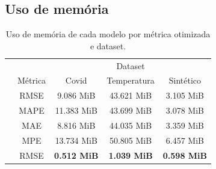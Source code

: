 \FloatBarrier

\subsection{Uso de memória}

\begin{table}[!htp]
    \caption{Uso de memória de cada modelo por métrica otimizada e dataset.}
    \setlength\extrarowheight{5pt}
    \centering
    \begin{tabular}{|c|c|ccc|}
        \hline
        \rowcolor[HTML]{C0C0C0}
        \cellcolor[HTML]{C0C0C0}                          & \cellcolor[HTML]{C0C0C0}                          & \multicolumn{3}{c|}{\cellcolor[HTML]{C0C0C0}Dataset}                                                                                                   \\ \cline{3-5}
        \rowcolor[HTML]{C0C0C0}
        \multirow{-2}{*}{\cellcolor[HTML]{C0C0C0}Modelo}  & \multirow{-2}{*}{\cellcolor[HTML]{C0C0C0}Métrica} & \multicolumn{1}{c|}{\cellcolor[HTML]{C0C0C0}Covid}              & \multicolumn{1}{c|}{\cellcolor[HTML]{C0C0C0}Temperatura}        & Sintético          \\ \hline
        \cellcolor[HTML]{C0C0C0}                          & RMSE                                              & \multicolumn{1}{c|}{9.086 MiB}                                  & \multicolumn{1}{c|}{43.621 MiB}                                 & 3.105 MiB          \\ \cline{2-5}
        \rowcolor[HTML]{EFEFEF}
        \cellcolor[HTML]{C0C0C0}                          & MAPE                                              & \multicolumn{1}{c|}{\cellcolor[HTML]{EFEFEF}11.383 MiB}         & \multicolumn{1}{c|}{\cellcolor[HTML]{EFEFEF}43.699 MiB}         & 3.078 MiB          \\ \cline{2-5}
        \cellcolor[HTML]{C0C0C0}                          & MAE                                               & \multicolumn{1}{c|}{8.816 MiB}                                  & \multicolumn{1}{c|}{44.035 MiB}                                 & 3.359 MiB          \\ \cline{2-5}
        \rowcolor[HTML]{EFEFEF}
        \multirow{-4}{*}{\cellcolor[HTML]{C0C0C0}ARIMA}   & MPE                                               & \multicolumn{1}{c|}{\cellcolor[HTML]{EFEFEF}13.734 MiB}         & \multicolumn{1}{c|}{\cellcolor[HTML]{EFEFEF}50.805 MiB}         & 6.457 MiB          \\ \hline
        \cellcolor[HTML]{C0C0C0}                          & RMSE                                              & \multicolumn{1}{c|}{\textbf{0.512 MiB}}                         & \multicolumn{1}{c|}{\textbf{1.039 MiB}}                         & \textbf{0.598 MiB} \\ \cline{2-5}

\end{tabular}
\end{table}
